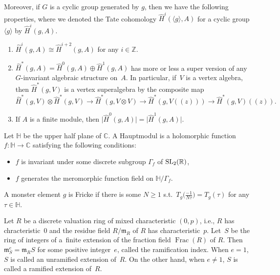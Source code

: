 \documentclass[10pt,a4paper]{amsart}
\numberwithin{equation}{section}
\begin{document}
Moreover, if $G$ is a cyclic group generated by $g$, then we have the following properties, where we denoted the Tate cohomology $\hat{H}^i(\langle g\rangle,A)$ for a cyclic group $\langle g\rangle$ by $\hat{H}^i(g,A)$.
\begin{enumerate}\itemsep=0pt
\item[(3)] ${\hat{H}}^i(g,A)\cong{\hat{H}}^{i+2}(g,A)$ for any $i\in\mathbb{Z}$.
\item[(4)]\label{Tsuper} ${\hat{H}}^\ast (g,A )=\hat{H}^0(g,A)\oplus\hat{H}^1(g,A)$ has more or less a super version of any $G$-invariant algebraic structure on~$A$. In particular, if~$V$ is a vertex algebra, then $\hat{H}^*(g,V)$ is a vertex superalgebra by the composite map
\[
\hat{H}^*(g,V)\otimes \hat{H}^*(g,V)\rightarrow \hat{H}^*(g,V\otimes V)\rightarrow \hat{H}^*(g,V((z)))\rightarrow \hat{H}^*(g,V)((z)).
\]
\item[(5)] If $A$ is a finite module, then $\big|{\hat{H}}^0(g,A)\big|=\big|{\hat{H}}^1(g,A)\big|$.
\end{enumerate}

\begin{Definition}
Let $\mathbb{H}$ be the upper half plane of $\mathbb{C}$. A Hauptmodul is a holomorphic function $f\colon \mathbb{H} \rightarrow \mathbb{C}$ satisfying the following conditions:
\begin{itemize}\itemsep=0pt
\item $f$ is invariant under some discrete subgroup $\Gamma_f$ of ${\rm SL}_2(\mathbb{R})$,
\item $f$ generates the meromorphic function field on $\mathbb{H}/\Gamma_f$.
\end{itemize}
\end{Definition}

\begin{Definition}\label{def2.9}
A monster element $g$ is Fricke if there is some $N\geq 1$ s.t.\ $T_g\big(\frac{-1}{N\tau}\big)=T_g(\tau)$ for any $\tau \in \mathbb{H}$.
\end{Definition}

\begin{Definition}
Let $R$ be a discrete valuation ring of mixed characteristic $(0,p)$, i.e., $R$ has chracteristic~0 and the residue field $R/\mathfrak{m}_R$ of $R$ has characteristic~$p$. Let~$S$ be the ring of integers of a~finite extension of the fraction field $\operatorname{Frac}(R)$ of $R$. Then $\mathfrak{m}^e_S=\mathfrak{m}_RS$ for some positive integer~$e$, called the ramification index. When $e=1$, $S$ is called an unramified extension of~$R$. On the other hand, when $e\neq 1$, $S$ is called a ramified extension of~$R$.
\end{Definition}
\end{document}
